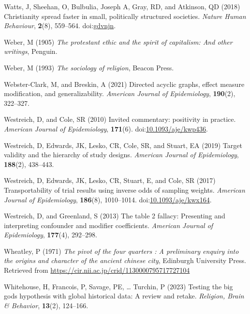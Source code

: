 \documentclass[
  single column]{article}
\newlength{\cslhangindent}
\newenvironment{CSLReferences}[2] %
 {\begin{list}{}{%
  \setlength{\itemindent}{0pt}
  \setlength{\leftmargin}{0pt}
  \setlength{\parsep}{0pt}
  \ifodd #1
   \setlength{\leftmargin}{\cslhangindent}
   \setlength{\itemindent}{-1\cslhangindent}
  \fi
  \setlength{\itemsep}{#2\baselineskip}}}
 {\end{list}}
\begin{document}
\begin{CSLReferences}{1}{0}
Watts, J, Sheehan, O, Bulbulia, Joseph A, Gray, RD, and Atkinson, QD
(2018) Christianity spread faster in small, politically structured
societies. \emph{Nature Human Behaviour}, \textbf{2}(8), 559--564.
doi:\href{https://doi.org/gdvnjn}{gdvnjn}.

Weber, M (1905) \emph{The protestant ethic and the spirit of capitalism:
And other writings}, Penguin.

Weber, M (1993) \emph{The sociology of religion}, Beacon Press.

Webster-Clark, M, and Breskin, A (2021) Directed acyclic graphs, effect
measure modification, and generalizability. \emph{American Journal of
Epidemiology}, \textbf{190}(2), 322--327.

Westreich, D, and Cole, SR (2010) Invited commentary: positivity in
practice. \emph{American Journal of Epidemiology}, \textbf{171}(6).
doi:\href{https://doi.org/10.1093/aje/kwp436}{10.1093/aje/kwp436}.

Westreich, D, Edwards, JK, Lesko, CR, Cole, SR, and Stuart, EA (2019)
Target validity and the hierarchy of study designs. \emph{American
Journal of Epidemiology}, \textbf{188}(2), 438--443.

Westreich, D, Edwards, JK, Lesko, CR, Stuart, E, and Cole, SR (2017)
Transportability of trial results using inverse odds of sampling
weights. \emph{American Journal of Epidemiology}, \textbf{186}(8),
1010--1014.
doi:\href{https://doi.org/10.1093/aje/kwx164}{10.1093/aje/kwx164}.

Westreich, D, and Greenland, S (2013) The table 2 fallacy: Presenting
and interpreting confounder and modifier coefficients. \emph{American
Journal of Epidemiology}, \textbf{177}(4), 292--298.

Wheatley, P (1971) \emph{The pivot of the four quarters : A preliminary
enquiry into the origins and character of the ancient chinese city},
Edinburgh University Press. Retrieved from
\url{https://cir.nii.ac.jp/crid/1130000795717727104}

Whitehouse, H, Francois, P, Savage, PE, \ldots{} Turchin, P (2023)
Testing the big gods hypothesis with global historical data: A review
and retake. \emph{Religion, Brain \& Behavior}, \textbf{13}(2),
124--166.


\end{CSLReferences}
\end{document}
